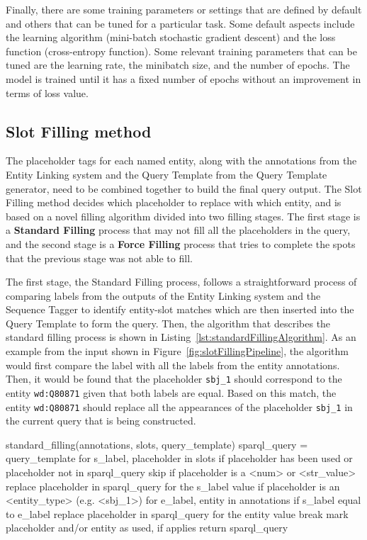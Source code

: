 Finally, there are some training parameters or settings that are defined by default and 
others that can be tuned for a particular task. Some default aspects include the learning 
algorithm (mini-batch stochastic gradient descent) and the loss function (cross-entropy 
function). Some relevant training parameters that can be tuned are the learning rate, the 
minibatch size, and the number of epochs. The model is trained until it has a fixed number of 
epochs without an improvement in terms of loss value.

\subsection{Slot Filling method}
\label{cap3:system/slotFillModule/fillingMethod}
The placeholder tags for each named entity, along with the annotations from the Entity 
Linking system and the Query Template from the Query Template generator, need to be combined 
together to build the final \SPARQL{} query output. The Slot Filling method decides which 
placeholder to replace with which entity, and is based on a novel filling algorithm divided 
into two filling stages. The first stage is a \textbf{Standard Filling} process that may not 
fill all the placeholders in the query, and the second stage is a \textbf{Force Filling} 
process that tries to complete the spots that the previous stage was not able to fill.

The first stage, the Standard Filling process, follows a straightforward process of comparing 
labels from the outputs of the Entity Linking system and the Sequence Tagger to identify 
entity-slot matches which are then inserted into the Query Template to form the \SPARQL{} query. 
Then, the algorithm that describes the standard filling process is shown in 
Listing~\ref{lst:standardFillingAlgorithm}. As an example from the input shown in 
Figure~\ref{fig:slotFillingPipeline}, the algorithm would first compare the label 
 with all the labels from the entity annotations. Then, it would 
be found that the placeholder \texttt{sbj\_1} should correspond to the entity 
\texttt{wd:Q80871} given that both labels are equal. Based on this match, the entity 
\texttt{wd:Q80871} should replace all the appearances of the placeholder \texttt{sbj\_1} in 
the current \SPARQL{} query that is being constructed.

\begin{sparqlcode}[%
    caption={Standard Filling algorithm.}, 
    label={lst:standardFillingAlgorithm}]
standard_filling(annotations, slots, query_template)
    sparql_query = query_template
    for s_label, placeholder in slots
        if placeholder has been used or placeholder not in sparql_query
            skip
        if placeholder is a <num> or <str_value>
            replace placeholder in sparql_query for the s_label value
        if placeholder is an <entity_type> (e.g. <sbj_1>)
            for e_label, entity in annotations
                if s_label equal to e_label
                    replace placeholder in sparql_query for the entity value
                    break
        mark placeholder and/or entity as used, if applies
    return sparql_query
\end{sparqlcode}

